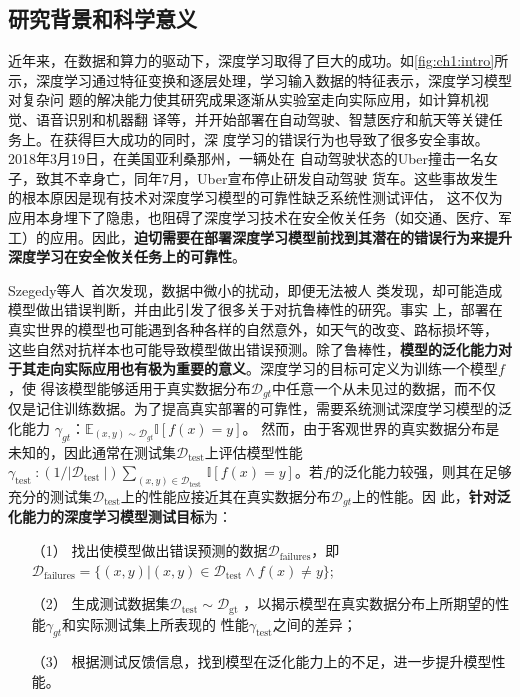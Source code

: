 
\subsection{研究背景和科学意义}



%
近年来，在数据和算力的驱动下，深度学习取得了巨大的成功。如\cref{fig:ch1:intro}所
示，深度学习通过特征变换和逐层处理，学习输入数据的特征表示，深度学习模型对复杂问
题的解决能力使其研究成果逐渐从实验室走向实际应用，如计算机视觉、语音识别和机器翻
译等，并开始部署在自动驾驶、智慧医疗和航天等关键任务上。在获得巨大成功的同时，深
度学习的错误行为也导致了很多安全事故。2018年3月19日，在美国亚利桑那州，一辆处在
自动驾驶状态的Uber撞击一名女子，致其不幸身亡，同年7月，Uber宣布停止研发自动驾驶
货车。这些事故发生的根本原因是现有技术对深度学习模型的可靠性缺乏系统性测试评估，
这不仅为应用本身埋下了隐患，也阻碍了深度学习技术在安全攸关任务（如交通、医疗、军
工）的应用。因此，\textbf{迫切需要在部署深度学习模型前找到其潜在的错误行为来提升
深度学习在安全攸关任务上的可靠性}。

Szegedy等人~\cite{szegedy2013intriguing}首次发现，数据中微小的扰动，即便无法被人
类发现，却可能造成模型做出错误判断，并由此引发了很多关于对抗鲁棒性的研究。事实
上，部署在真实世界的模型也可能遇到各种各样的自然意外，如天气的改变、路标损坏等，
这些自然对抗样本也可能导致模型做出错误预测。除了鲁棒性，\textbf{模型的泛化能力对
于其走向实际应用也有极为重要的意义}。深度学习的目标可定义为训练一个模型${f}$，使
得该模型能够适用于真实数据分布$\mathcal D_{gt}$中任意一个从未见过的数据，而不仅
仅是记住训练数据。为了提高真实部署的可靠性，需要系统测试深度学习模型的泛化能力
$\gamma_{gt}$：$\mathbb{E}_{(x, y) \sim \mathcal{D}_{g t}} \mathbb{I}[f(x)=y]$。
然而，由于客观世界的真实数据分布是未知的，因此通常在测试集$\mathcal
D_{\text{test}}$上评估模型性能$\gamma_{\text {test }}:\left(1 /\left|\mathcal
D_{\text {test }}\right|\right) \sum_{(x, y) \in \mathcal D_{\text {test }}}
\mathbb{I}[f(x)=y]$。若${f}$的泛化能力较强，则其在足够充分的测试集$\mathcal
D_{\text{test}}$上的性能应接近其在真实数据分布$\mathcal D_{gt}$上的性能。因
此，\textbf{针对泛化能力的深度学习模型测试目标}为：
\begin{itemize}
    \item[（1）] 找出使模型做出错误预测的数据$\mathcal D_{\text{failures}}$，即
    $\mathcal D_{\text{failures}}=\{(x, y) | (x, y) \in \mathcal D_{\text{test}}
    \wedge f(x) \neq y\}$;
    \item[（2）] 生成测试数据集$\mathcal{D}_{\text{test}} \sim \mathcal{D}_{\text{gt}}$
    ，以揭示模型在真实数据分布上所期望的性能$\gamma_{gt}$和实际测试集上所表现的
    性能$\gamma_{\text{test}}$之间的差异；
    \item[（3）] 根据测试反馈信息，找到模型在泛化能力上的不足，进一步提升模型性能。
\end{itemize}

